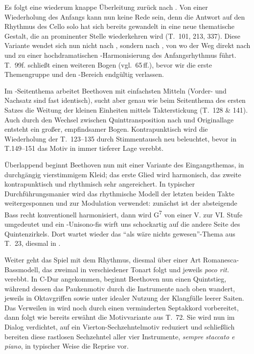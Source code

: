 Es folgt eine wiederum knappe Überleitung zurück nach .  Von
einer Wiederholung des Anfangs kann nun keine Rede sein, denn die
Antwort auf den Rhythmus des Cello solo hat sich bereits gewandelt
in eine neue thematische Gestalt, die an prominenter Stelle wiederkehren
wird (T.~101, 213, 337).  Diese Variante wendet sich nun nicht nach
, sondern nach , von wo der Weg direkt nach
 und zu einer hochdramatischen -Harmonisierung
des Anfangsrhythmus führt.  T.~99f. schließt einen weiteren Bogen
(vgl.~65\,ff.), bevor wir die erste Themengruppe und den -Bereich
endgültig verlassen.

Im -Seitenthema arbeitet Beethoven mit einfachsten
Mitteln (Vorder- und Nachsatz sind fast identisch), sucht aber
genau wie beim Seitenthema des ersten Satzes die Weitung der kleinen
Einheiten mittels Takterstickung (T.~128 \& 141). Auch durch den Wechsel
zwischen Quinttransposition nach  und Originallage
entsteht ein großer, empfindsamer Bogen.  Kontrapunktisch wird die
Wiederholung der T.~123–135 durch Stimmentausch neu beleuchtet,
bevor in T.149–151 das Motiv in immer tieferer Lage verebbt.

Überlappend beginnt Beethoven nun mit einer Variante des
Eingangsthemas, in durchgängig vierstimmigem Kleid; das erste
Glied wird harmonisch, das zweite kontrapunktisch und rhythmisch
sehr angereichert.  In typischer Durchführungsmanier wird das
rhythmische Modell der letzten beiden Takte weitergesponnen und
zur Modulation verwendet: zunächst ist der absteigende Bass recht
konventionell harmonisiert, dann wird G\textsuperscript{7} von
einer V. zur VI. Stufe umgedeutet und ein -Unisono-fis
wirft uns schockartig auf die andere Seite des Quintenzirkels.
Dort wartet wieder das \enquote{als wäre nichts gewesen}-Thema aus
T.~23, diesmal in .

Weiter geht das Spiel mit dem Rhythmus, diesmal über einer Art
Ro\-ma\-nes\-ca-Bass\-mo\-dell, das zweimal in verschiedener Tonart folgt
und jeweils \textit{poco rit.} verebbt.  In C-Dur angekommen, beginnt
Beethoven nun einen Quintstieg, während dessen das Paukenmotiv
durch die Instrumente nach oben wandert, jeweils in Oktavgriffen
sowie unter idealer Nutzung der Klangfülle leerer Saiten.  Das
Verweilen in  wird noch durch einen verminderten
Septakkord vorbereitet, dann folgt wie bereits erwähnt die
Motivvariante aus T.~72.  Sie wird nun im Dialog verdichtet, auf
ein Vierton-Sechzehntelmotiv reduziert und schließlich bereiten
diese rastlosen Sechzehntel aller vier Instrumente, \textit{sempre
staccato e piano}, in typischer Weise die Reprise vor.

